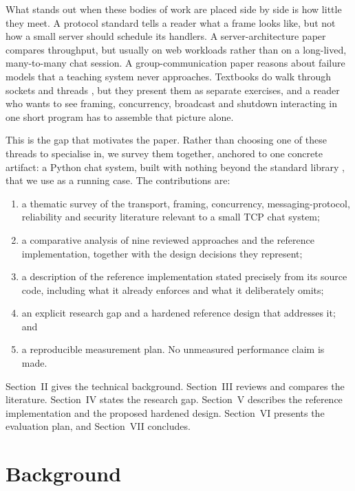 \documentclass[conference]{IEEEtran}
\begin{document}
What stands out when these bodies of work are placed side by side is how little they meet. A protocol standard tells a reader what a frame looks like, but not how a small server should schedule its handlers. A server-architecture paper compares throughput, but usually on web workloads rather than on a long-lived, many-to-many chat session. A group-communication paper reasons about failure models that a teaching system never approaches. Textbooks do walk through sockets and threads \cite{stevens,tanenbaum,kurose}, but they present them as separate exercises, and a reader who wants to see framing, concurrency, broadcast and shutdown interacting in one short program has to assemble that picture alone.

This is the gap that motivates the paper. Rather than choosing one of these threads to specialise in, we survey them together, anchored to one concrete artifact: a Python chat system, built with nothing beyond the standard library \cite{pysocket,pythreading}, that we use as a running case. The contributions are:
\begin{enumerate}
  \item a thematic survey of the transport, framing, concurrency, messaging-protocol, reliability and security literature relevant to a small TCP chat system;
  \item a comparative analysis of nine reviewed approaches and the reference implementation, together with the design decisions they represent;
  \item a description of the reference implementation stated precisely from its source code, including what it already enforces and what it deliberately omits;
  \item an explicit research gap and a hardened reference design that addresses it; and
  \item a reproducible measurement plan. No unmeasured performance claim is made.
\end{enumerate}
Section~II gives the technical background. Section~III reviews and compares the literature. Section~IV states the research gap. Section~V describes the reference implementation and the proposed hardened design. Section~VI presents the evaluation plan, and Section~VII concludes.

\section{Background}
\end{document}
